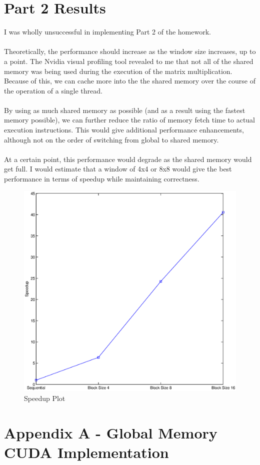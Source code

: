 \documentclass{article}
\begin{document}
\section*{Part 2 Results}
\begin{par}
I was wholly unsuccessful in implementing Part 2 of the homework. \\
\\
Theoretically, the performance should increase as the window size increases, up to a point.  The Nvidia visual profiling tool revealed to me that not all of the shared memory was being used during the execution of the matrix multiplication.  Because of this, we can cache more into the the shared memory over the course of the operation of a single thread.\\
\\
By using as much shared memory as possible (and as a result using the fastest memory possible), we can further reduce the ratio of memory fetch time to actual execution instructions.  This would give additional performance enhancements, although not on the order of switching from global to shared memory.\\
\\
At a certain point, this performance would degrade as the shared memory would get full.  I would estimate that a window of 4x4 or 8x8 would give the best performance in terms of speedup while maintaining correctness.
\end{par}



\begin{figure}[htp]
	\begin{center}
	\includegraphics[width=5in]{speedup.eps}
	\caption{Speedup Plot}
	\label{fig:figure1}
	\end{center}
\end{figure}

\newpage
\section*{Appendix A - Global Memory CUDA Implementation}

\end{document}
